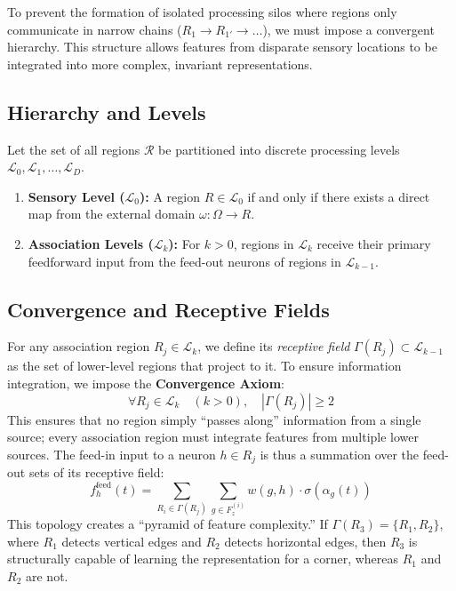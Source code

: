 \documentclass[11pt]{article}
\begin{document}
To prevent the formation of isolated processing silos where regions only communicate in narrow chains ($R_{1} \to R_{1'} \to \dots$), we must impose a convergent hierarchy. This structure allows features from disparate sensory locations to be integrated into more complex, invariant representations.

\subsection{Hierarchy and Levels}
Let the set of all regions $\mathcal{R}$ be partitioned into discrete processing levels $\mathcal{L}_0, \mathcal{L}_1, \ldots, \mathcal{L}_D$.
\begin{enumerate}
    \item \textbf{Sensory Level ($\mathcal{L}_0$):} A region $R \in \mathcal{L}_0$ if and only if there exists a direct map from the external domain $\omega: \Omega \to R$.
    \item \textbf{Association Levels ($\mathcal{L}_k$):} For $k > 0$, regions in $\mathcal{L}_k$ receive their primary feedforward input from the feed-out neurons of regions in $\mathcal{L}_{k-1}$.
\end{enumerate}

\subsection{Convergence and Receptive Fields}
For any association region $R_j \in \mathcal{L}_k$, we define its \textit{receptive field} $\Gamma(R_j) \subset \mathcal{L}_{k-1}$ as the set of lower-level regions that project to it. To ensure information integration, we impose the \textbf{Convergence Axiom}:
\begin{equation}
    \forall R_j \in \mathcal{L}_k \quad (k>0), \quad |\Gamma(R_j)| \ge 2
\end{equation}
This ensures that no region simply ``passes along'' information from a single source; every association region must integrate features from multiple lower sources. The feed-in input to a neuron $h \in R_j$ is thus a summation over the feed-out sets of its receptive field:
\begin{equation}
    f_h^\text{feed}(t) = \sum_{R_i \in \Gamma(R_j)} \sum_{g \in F_z^{(i)}} w(g, h) \cdot \sigma(\alpha_g(t))
\end{equation}
This topology creates a ``pyramid of feature complexity.'' If $\Gamma(R_3) = \{R_1, R_2\}$, where $R_1$ detects vertical edges and $R_2$ detects horizontal edges, then $R_3$ is structurally capable of learning the representation for a corner, whereas $R_1$ and $R_2$ are not.
\end{document}
